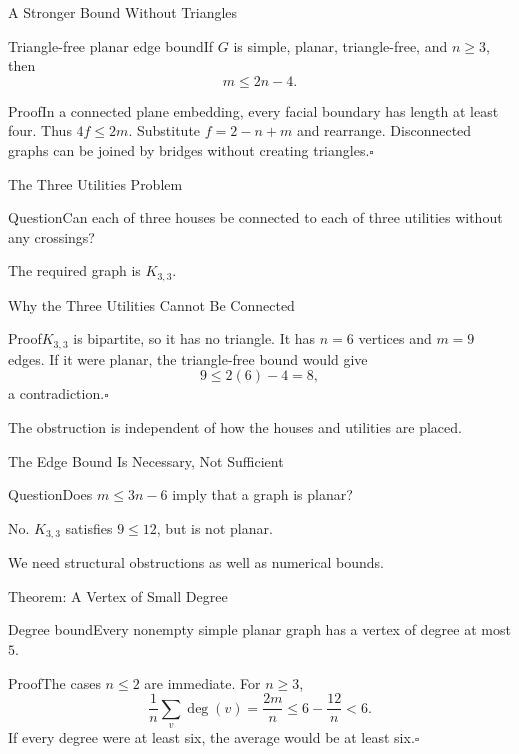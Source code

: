 \documentclass[aspectratio=169,11pt]{beamer}
\newcommand{\Thm}[2]{\begin{block}{#1}#2\end{block}}
\renewcommand{\Proof}[1]{\begin{block}{Proof}\normalsize #1\end{block}}
\newcommand{\Question}[1]{\begin{block}{Question}#1\end{block}}
\newcommand{\gap}{\par\medskip}
\begin{document}
\begin{frame}{A Stronger Bound Without Triangles}
\large
\Thm{Triangle-free planar edge bound}{If $G$ is simple, planar, triangle-free, and $n\ge3$, then\[m\le2n-4.\]}
\Proof{In a connected plane embedding, every facial boundary has length at least four. Thus $4f\le2m$. Substitute $f=2-n+m$ and rearrange. Disconnected graphs can be joined by bridges without creating triangles.\hfill$\square$}
\end{frame}
\begin{frame}{The Three Utilities Problem}
\large
\begin{center}\end{center}
\Question{Can each of three houses be connected to each of three utilities without any crossings?}
The required graph is $K_{3,3}$.
\end{frame}
\begin{frame}{Why the Three Utilities Cannot Be Connected}
\large
\Proof{$K_{3,3}$ is bipartite, so it has no triangle. It has $n=6$ vertices and $m=9$ edges. If it were planar, the triangle-free bound would give\[9\le2(6)-4=8,\]a contradiction.\hfill$\square$}
\gap The obstruction is independent of how the houses and utilities are placed.
\end{frame}
\begin{frame}{The Edge Bound Is Necessary, Not Sufficient}
\large
\Question{Does $m\le3n-6$ imply that a graph is planar?}
No. $K_{3,3}$ satisfies $9\le12$, but is not planar.
\gap We need structural obstructions as well as numerical bounds.
\end{frame}
\begin{frame}{Theorem: A Vertex of Small Degree}
\large
\Thm{Degree bound}{Every nonempty simple planar graph has a vertex of degree at most $5$.}
\Proof{The cases $n\le2$ are immediate. For $n\ge3$,\[\frac1n\sum_{v}\deg(v)=\frac{2m}{n}\le6-\frac{12}{n}<6.\]If every degree were at least six, the average would be at least six.\hfill$\square$}
\end{frame}
\end{document}

